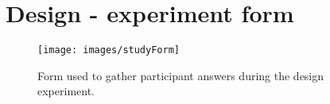 \chapter{Design - experiment form}
\label{app:studyForm}

\begin{figure}[htb]
  \centering
    \texttt{[image: images/studyForm]}
  \caption{Form used to gather participant answers during the design experiment.}
  \label{studyScreenshot}
\end{figure}
